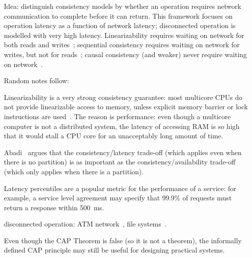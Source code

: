 \documentclass[a4paper,twocolumn,10pt]{article}
\begin{document}
Idea: distinguish consistency models by whether an operation requires network communication to
complete before it can return. This framework focuses on operation latency as a function of network
latency; disconnected operation is modelled with very high latency. Linearizability requires waiting
on network for both reads and writes~\cite{Attiya1994gw}; sequential consistency requires waiting on
network for writes, but not for reads~\cite{Attiya1994gw, Lipton1988uh}; causal consistency (and
weaker) never require waiting on network~\cite{Mahajan2011wz}.

Random notes follow:

Linearizability is a very strong consistency guarantee: most multicore CPUs do not provide
linearizable access to memory, unless explicit memory barrier or lock instructions are
used~\cite{Sewell2010fj}. The reason is performance: even though a multicore computer is not a
distributed system, the latency of accessing RAM is so high that it would stall a CPU core for an
unacceptably long amount of time.

Abadi~\cite{Abadi2012hb} argues that the consistency/latency trade-off (which applies even when
there is no partition) is as important as the consistency/availability trade-off (which only applies
when there is a partition).

Latency percentiles are a popular metric for the performance of a service: for example, a service
level agreement may specify that 99.9\% of requests must return a response within 500~ms.

disconnected operation: ATM network~\cite{Brewer2012tr}, file systems~\cite{Kistler1992bt}.


Even though the CAP Theorem is false (so it is not a theorem), the informally defined CAP principle
may still be useful for designing practical systems.
\end{document}
